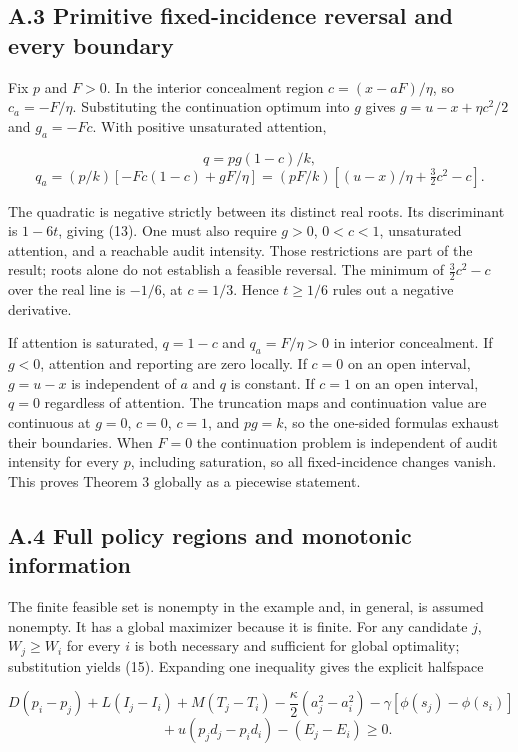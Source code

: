 \documentclass[
  11pt,
]{article}
\begin{document}
\subsection{A.3 Primitive fixed-incidence reversal and every
boundary}\label{a.3-primitive-fixed-incidence-reversal-and-every-boundary}

Fix \(p\) and \(F>0\). In the interior concealment region
\(c=(x-aF)/\eta\), so \(c_a=-F/\eta\). Substituting the continuation
optimum into \(g\) gives \(g=u-x+\eta c^2/2\) and \(g_a=-Fc\). With
positive unsaturated attention,

\[q=pg(1-c)/k,\] \[q_a=(p/k)[-Fc(1-c)+gF/\eta]
 =(pF/k)[(u-x)/\eta+\tfrac32c^2-c].\]

The quadratic is negative strictly between its distinct real roots. Its
discriminant is \(1-6t\), giving (13). One must also require \(g>0\),
\(0<c<1\), unsaturated attention, and a reachable audit intensity. Those
restrictions are part of the result; roots alone do not establish a
feasible reversal. The minimum of \(\tfrac32c^2-c\) over the real line
is \(-1/6\), at \(c=1/3\). Hence \(t\geq1/6\) rules out a negative
derivative.

If attention is saturated, \(q=1-c\) and \(q_a=F/\eta>0\) in interior
concealment. If \(g<0\), attention and reporting are zero locally. If
\(c=0\) on an open interval, \(g=u-x\) is independent of \(a\) and \(q\)
is constant. If \(c=1\) on an open interval, \(q=0\) regardless of
attention. The truncation maps and continuation value are continuous at
\(g=0\), \(c=0\), \(c=1\), and \(pg=k\), so the one-sided formulas
exhaust their boundaries. When \(F=0\) the continuation problem is
independent of audit intensity for every \(p\), including saturation, so
all fixed-incidence changes vanish. This proves Theorem 3 globally as a
piecewise statement.

\subsection{A.4 Full policy regions and monotonic
information}\label{a.4-full-policy-regions-and-monotonic-information}

The finite feasible set is nonempty in the example and, in general, is
assumed nonempty. It has a global maximizer because it is finite. For
any candidate \(j\), \(W_j\geq W_i\) for every \(i\) is both necessary
and sufficient for global optimality; substitution yields (15).
Expanding one inequality gives the explicit halfspace

\[D(p_i-p_j)+L(I_j-I_i)+M(T_j-T_i)
 -\frac{\kappa}{2}(a_j^2-a_i^2)
 -\gamma[\phi(s_j)-\phi(s_i)]\]
\[\hspace{1cm}+u(p_jd_j-p_id_i)-(E_j-E_i)\geq0. \tag{A1}\]
\end{document}
